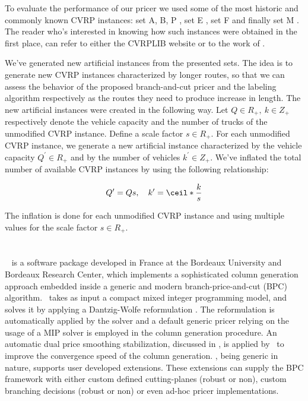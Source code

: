 \medskip

To evaluate the performance of our pricer we used some of the most historic
and commonly known
CVRP instances:
set A, B, P \parencite{augerat1995}, set E \parencite{christofides1969},
set F \parencite{fisher1994}
and finally set M \parencite{christofides1979}.
The reader who's interested in knowing how such instances were obtained in the first
place, can refer to either the CVRPLIB website or to the work of \textcite{uchoa2017}.

\medskip
{}

\medskip

We've generated new artificial instances from the presented sets.
The idea is to generate new CVRP instances characterized by longer routes,
so that we can assess the behavior of the proposed branch-and-cut pricer
and the labeling algorithm respectively as the routes
they need to produce increase in length.
The new artificial instances were created in the following way.
Let $Q \in R_+,\ k \in Z_+$ respectively denote the vehicle
capacity and the number of trucks of the unmodified CVRP instance.
Define a scale factor $s \in R_+$.
For each unmodified CVRP instance, we generate a new artificial instance
characterized by the vehicle capacity $Q^\prime \in R_+$
and by the number of vehicles $k^\prime \in Z_+$.
We've inflated the total number of available CVRP instances
by using the following relationship:

$$
	Q^\prime = Q s, \quad k^\prime = \ceil*{\frac{k}{s}}
$$

The inflation is done for each unmodified CVRP instance and using
multiple values for the scale factor $s \in R_+$.


\section{\bapcod}
\label{sec:results-bapcod}

\textit{\bapcod}\ \parencite{sadykov2021} is a software package
developed in France at the Bordeaux University and Bordeaux Research Center,
which implements a sophisticated column generation approach
embedded inside a generic and modern branch-price-and-cut (BPC) algorithm.
\bapcod\ takes as input a compact mixed integer programming model,
and solves it by applying a Dantzig-Wolfe reformulation \parencite{dantzig1960}.
The reformulation is automatically applied by the solver
and a default generic pricer relying on
the usage of a MIP solver is employed in the column generation procedure.
An automatic dual price smoothing stabilization, discussed in \textcite{pessoa2018automation},
is applied by \bapcod\ to improve the convergence speed of the column generation.
\bapcod, being generic in nature,
supports user developed extensions.
These extensions can supply the BPC framework with either
custom defined cutting-planes (robust or non), custom branching decisions (robust or non)
or even ad-hoc pricer implementations.

